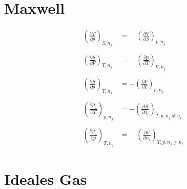 \documentclass[twocolumn]{article}
\begin{document}

\section{Maxwell}

\begin{align*}
	\left(\frac{\partial T}{\partial p}\right)_{S,n_j}
	&= \quad
	\left(\frac{\partial V}{\partial S}\right)_{p,n_j}
	\\\\
	\left(\frac{\partial S}{\partial V}\right)_{T,n_j}
	&= \quad
	\left(\frac{\partial p}{\partial T}\right)_{V,n_j}
	\\\\
	\left(\frac{\partial S}{\partial p}\right)_{T,n_j}
	&= -
	\left(\frac{\partial V}{\partial T}\right)_{p,n_j}
	\\\\
	\left(\frac{\partial \mu _i}{\partial T}\right)_{p,n_j}
	&= -
	\left(\frac{\partial S}{\partial n_i}\right)_{T,p,n_j \neq n_i}
	\\\\
	\left(\frac{\partial \mu_i}{\partial p}\right)_{T,n_j}
	&=
	\quad \left(\frac{\partial V}{\partial n_i}\right)_{T,p,n_j \neq n_i}
\end{align*}

                                                        
\section{Ideales Gas}
\setlength{\belowdisplayskip}{-10pt} \setlength{\belowdisplayshortskip}{-10pt}
\end{document}
